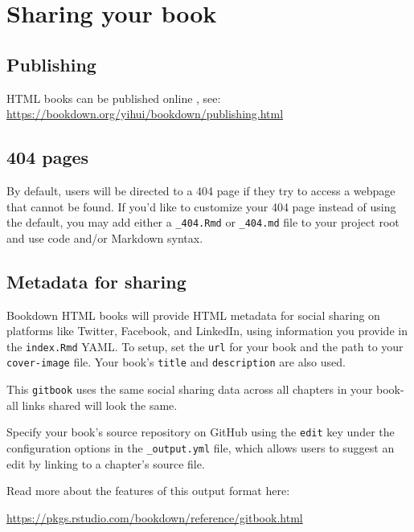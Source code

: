 \documentclass[
  12pt,
]{book}
\theoremstyle{definition}
\theoremstyle{definition}
\theoremstyle{definition}
\theoremstyle{definition}
\theoremstyle{remark}
\begin{document}
\hypertarget{sharing-your-book}{%
\chapter{Sharing your book}\label{sharing-your-book}}

\hypertarget{publishing}{%
\section{Publishing}\label{publishing}}

HTML books can be published online , see: \url{https://bookdown.org/yihui/bookdown/publishing.html}

\hypertarget{pages}{%
\section{404 pages}\label{pages}}

By default, users will be directed to a 404 page if they try to access a webpage that cannot be found. If you'd like to customize your 404 page instead of using the default, you may add either a \texttt{\_404.Rmd} or \texttt{\_404.md} file to your project root and use code and/or Markdown syntax.

\hypertarget{metadata-for-sharing}{%
\section{Metadata for sharing}\label{metadata-for-sharing}}

Bookdown HTML books will provide HTML metadata for social sharing on platforms like Twitter, Facebook, and LinkedIn, using information you provide in the \texttt{index.Rmd} YAML. To setup, set the \texttt{url} for your book and the path to your \texttt{cover-image} file. Your book's \texttt{title} and \texttt{description} are also used.

This \texttt{gitbook} uses the same social sharing data across all chapters in your book- all links shared will look the same.

Specify your book's source repository on GitHub using the \texttt{edit} key under the configuration options in the \texttt{\_output.yml} file, which allows users to suggest an edit by linking to a chapter's source file.

Read more about the features of this output format here:

\url{https://pkgs.rstudio.com/bookdown/reference/gitbook.html}
\end{document}
